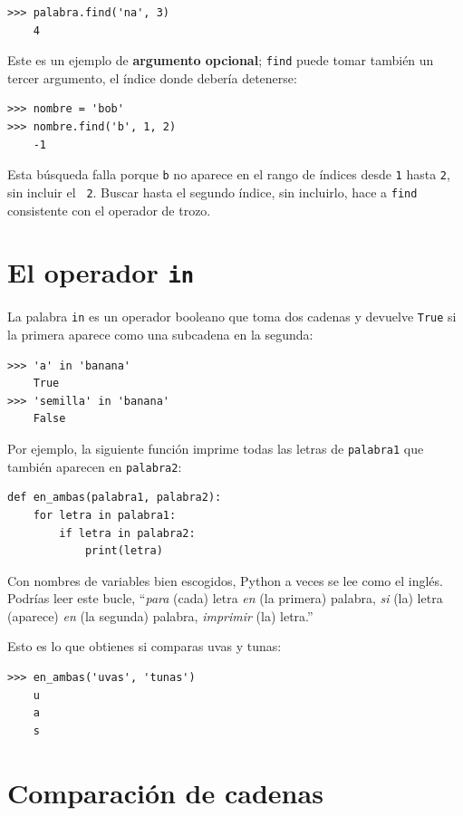 \documentclass[10pt]{book}
\begin{document}
\begin{verbatim}
>>> palabra.find('na', 3)
    4
\end{verbatim}
%
Este es un ejemplo de {\bf argumento opcional};
{\tt find} puede
tomar también un tercer argumento, el índice donde debería detenerse:

\begin{verbatim}
>>> nombre = 'bob'
>>> nombre.find('b', 1, 2)
    -1
\end{verbatim}
%
Esta búsqueda falla porque {\tt b} no
aparece en el rango de índices desde {\tt 1} hasta {\tt 2}, sin incluir el {\tt
2}.  Buscar hasta el segundo índice, sin incluirlo, hace a
{\tt find} consistente con el operador de trozo.



\section{El operador {\tt in}}
\label{inboth}

La palabra {\tt in} es un operador booleano que toma dos cadenas y
devuelve {\tt True} si la primera aparece como una subcadena en la segunda:

\begin{verbatim}
>>> 'a' in 'banana'
    True
>>> 'semilla' in 'banana'
    False
\end{verbatim}
%
Por ejemplo, la siguiente función imprime todas las
letras de {\tt palabra1} que también aparecen en {\tt palabra2}:

\begin{verbatim}
def en_ambas(palabra1, palabra2):
    for letra in palabra1:
        if letra in palabra2:
            print(letra)
\end{verbatim}
%
Con nombres de variables bien escogidos,
Python a veces se lee como el inglés.  Podrías leer
este bucle, ``{\em para} (cada) letra {\em en} (la primera) palabra, {\em si} (la) letra
(aparece) {\em en} (la segunda) palabra, {\em imprimir} (la) letra.''

Esto es lo que obtienes si comparas uvas y tunas:

\begin{verbatim}
>>> en_ambas('uvas', 'tunas')
    u
    a
    s
\end{verbatim}
%

\section{Comparación de cadenas}
\end{document}
